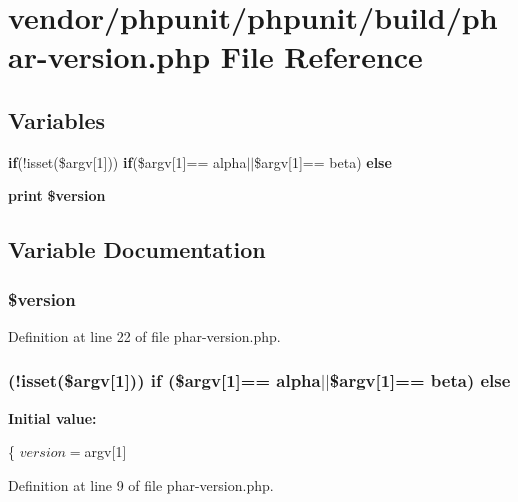 \section{vendor/phpunit/phpunit/build/phar-\/version.php File Reference}
\label{phar-version_8php}
\subsection*{Variables}
\begin{DoxyCompactItemize}
\item 
{\bf if}(!isset(\$argv[1])) {\bf if}(\$argv[1]== \textquotesingle{}alpha\textquotesingle{}$\vert$$\vert$\$argv[1]== \textquotesingle{}beta\textquotesingle{}) {\bf else}
\item 
{\bf print} {\bf \$version}
\end{DoxyCompactItemize}


\subsection{Variable Documentation}
\subsubsection[{\$version}]{ \${\bf version}}\label{phar-version_8php_af0a7c3f2fa7e976cdcf106b02c028867}


Definition at line 22 of file phar-\/version.\+php.

\subsubsection[{else}]{ (!isset(\$argv[1])) {\bf if} (\$argv[1]== \textquotesingle{}alpha\textquotesingle{}$\vert$$\vert$\$argv[1]== \textquotesingle{}beta\textquotesingle{}) else}\label{phar-version_8php_a870a3d0e6e5fa138d0464bc8c7515d1e}
{\bfseries Initial value\+:}
\begin{DoxyCode}
\{
    $version = $argv[1]
\end{DoxyCode}


Definition at line 9 of file phar-\/version.\+php.

